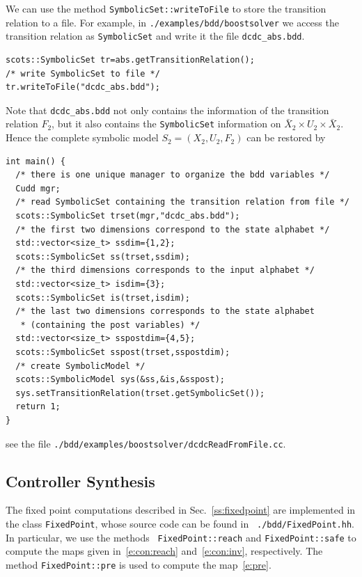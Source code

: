 \documentclass[a4paper]{amsart}
\begin{document}
We can use the method {\tt\small SymbolicSet::writeToFile} to store the transition relation to a file.
For example, in {\tt\small ./examples/bdd/boostsolver} we access the transition relation as {\tt\small SymbolicSet} and write it the file {\tt\small dcdc\_abs.bdd}.
\begin{lstlisting}[basicstyle=\footnotesize\ttfamily]
scots::SymbolicSet tr=abs.getTransitionRelation();
/* write SymbolicSet to file */
tr.writeToFile("dcdc_abs.bdd");
\end{lstlisting}
Note that {\tt\small dcdc\_abs.bdd} not only contains the information of the
transition relation $F_2$, but it also contains the {\tt\small SymbolicSet}
information on $\bar X_2\times U_2\times \bar X_2$. Hence the complete symbolic model
$S_2=(X_2,U_2,F_2)$ can be restored by  
\begin{lstlisting}[basicstyle=\footnotesize\ttfamily]
int main() {
  /* there is one unique manager to organize the bdd variables */
  Cudd mgr;
  /* read SymbolicSet containing the transition relation from file */
  scots::SymbolicSet trset(mgr,"dcdc_abs.bdd");
  /* the first two dimensions correspond to the state alphabet */
  std::vector<size_t> ssdim={1,2};
  scots::SymbolicSet ss(trset,ssdim);
  /* the third dimensions corresponds to the input alphabet */
  std::vector<size_t> isdim={3};
  scots::SymbolicSet is(trset,isdim);
  /* the last two dimensions corresponds to the state alphabet 
   * (containing the post variables) */
  std::vector<size_t> sspostdim={4,5};
  scots::SymbolicSet sspost(trset,sspostdim);
  /* create SymbolicModel */
  scots::SymbolicModel sys(&ss,&is,&sspost);                                                                                                                                                                                                                                                                                                                               
  sys.setTransitionRelation(trset.getSymbolicSet());
  return 1;
}
\end{lstlisting}
see the file {\tt\small ./bdd/examples/boostsolver/dcdcReadFromFile.cc}.



\newpage

\subsection{Controller Synthesis}
\label{ss:controllersynthesis}
The fixed point computations described in Sec.~\ref{ss:fixedpoint} are
implemented in the class {\tt\small FixedPoint}, whose source code can be found  in {\tt\small
./bdd/FixedPoint.hh}. In particular, we use the methods {\tt\small
FixedPoint::reach} and {\tt\small FixedPoint::safe} to compute the maps given in~\eqref{e:con:reach}
and~\eqref{e:con:inv}, respectively. The method  {\tt\small FixedPoint::pre} is
used to compute the map~\eqref{e:pre}.  
\end{document}
